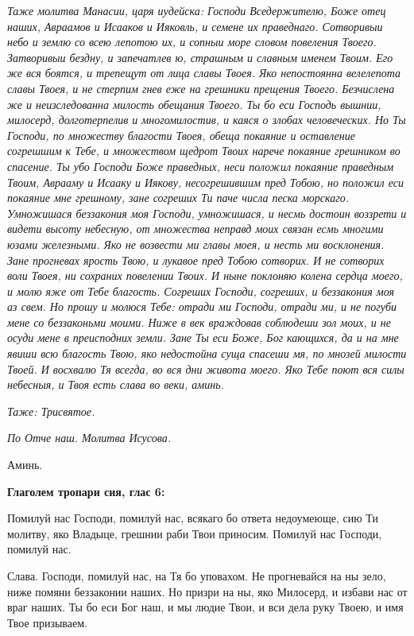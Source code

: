 \itshape Таже молитва Манасии, царя иудейска:\normalfont{} Господи Вседержителю, Боже отец наших, Авраамов и Исааков и Ияковль, и семене их праведнаго. Сотворивыи небо и землю со всею лепотою их, и сопныи море словом повеления Твоего. Затворивыи бездну, и запечатлев ю, страшным и славным именем Твоим. Его же вся боятся, и трепещут от лица славы Твоея. Яко непостоянна велелепота славы Твоея, и не стерпим гнев еже на грешники прещения Твоего. Безчислена же и неизследованна милость обещания Твоего. Ты бо еси Господь вышнии, милосерд, долготерпелив и многомилостив, и каяся о злобах человеческих. Но Ты Господи, по множеству благости Твоея, обеща покаяние и оставление согрешшим к Тебе, и множеством щедрот Твоих нарече покаяние грешником во спасение. Ты убо Господи Боже праведных, неси положил покаяние праведным Твоим, Аврааму и Исааку и Иякову, несогрешившим пред Тобою, но положил еси покаяние мне грешному, зане согреших Ти паче числа песка морскаго. Умножишася беззакония моя Господи, умножишася, и несмь достоин воззрети и видети высоту небесную, от множества неправд моих связан есмь многими юзами железными. Яко не возвести ми главы моея, и несть ми восклонения. Зане прогневах ярость Твою, и лукавое пред Тобою сотворих. И не сотворих воли Твоея, ни сохраних повелении Твоих. И ныне поклоняю колена сердца моего, и молю яже от Тебе благость. Согреших Господи, согреших, и беззакония моя аз свем. Но прошу и молюся Тебе: отради ми Господи, отради ми, и не погуби мене со беззаконьми моими. Ниже в век враждовав соблюдеши зол моих, и не осуди мене в преисподних земли. Зане Ты еси Боже, Бог кающихся, да и на мне явиши всю благость Твою, яко недостойна суща спасеши мя, по мнозей милости Твоей. И восхвалю Тя всегда, во вся дни живота моего. Яко Тебе поют вся силы небесныя, и Твоя есть слава во веки, аминь.


\itshape Таже: Трисвятое.\normalfont{}


\itshape По Отче наш. Молитва Исусова.\normalfont{}


Аминь.







\bfseries Глаголем тропари сия, глас 6:\normalfont{}


Помилуй нас Господи, помилуй нас, всякаго бо ответа недоумеюще, сию Ти молитву, яко Владыце, грешнии раби Твои приносим. Помилуй нас Господи, помилуй нас.


Слава. Господи, помилуй нас, на Тя бо уповахом. Не прогневайся на ны зело, ниже помяни беззаконии наших. Но призри на ны, яко Милосерд, и избави нас от враг наших. Ты бо еси Бог наш, и мы людие Твои, и вси дела руку Твоею, и имя Твое призываем.


